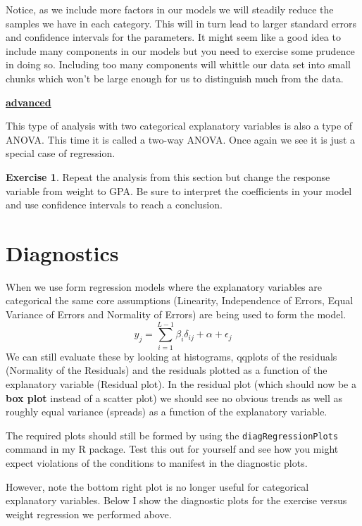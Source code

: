 \documentclass[
]{book}
\newenvironment{rmdblock}[1]
  {\begin{shaded*}
  \centerline{\underline{\textbf{#1}}}

  }
  {
  \end{shaded*}
  }
\newenvironment{advanced}
  {\begin{rmdblock}{advanced}}
  {\end{rmdblock}}
\theoremstyle{definition}
\theoremstyle{definition}
\theoremstyle{definition}
\newtheorem{exercise}{Exercise}[chapter]
\theoremstyle{definition}
\theoremstyle{remark}
\begin{document}
Notice, as we include more factors in our models we will steadily reduce the samples we have in each category. This will in turn lead to larger standard errors and confidence intervals for the parameters. It might seem like a good idea to include many components in our models but you need to exercise some prudence in doing so. Including too many components will whittle our data set into small chunks which won't be large enough for us to distinguish much from the data.

\begin{advanced}
This type of analysis with two categorical explanatory variables is also a type of ANOVA. This time it is called a two-way ANOVA. Once again we see it is just a special case of regression.
\end{advanced}

\begin{exercise}
\protect\hypertarget{exr:unnamed-chunk-476}{}\label{exr:unnamed-chunk-476}Repeat the analysis from this section but change the response variable from weight to GPA. Be sure to interpret the coefficients in your model and use confidence intervals to reach a conclusion.
\end{exercise}

\hypertarget{diagnostics}{%
\section{Diagnostics}\label{diagnostics}}

When we use form regression models where the explanatory variables are categorical the same core assumptions (Linearity, Independence of Errors, Equal Variance of Errors and Normality of Errors) are being used to form the model.
\[ y_j = \sum_{i=1}^{L-1} \beta_i \delta_{ij} + \alpha+\epsilon_j \]
We can still evaluate these by looking at histograms, qqplots of the residuals (Normality of the Residuals) and the residuals plotted as a function of the explanatory variable (Residual plot). In the residual plot (which should now be a \textbf{box plot} instead of a scatter plot) we should see no obvious trends as well as roughly equal variance (spreads) as a function of the explanatory variable.

The required plots should still be formed by using the \texttt{diagRegressionPlots} command in my R package. Test this out for yourself and see how you might expect violations of the conditions to manifest in the diagnostic plots.

However, note the bottom right plot is no longer useful for categorical explanatory variables. Below I show the diagnostic plots for the exercise versus weight regression we performed above.
\end{document}
